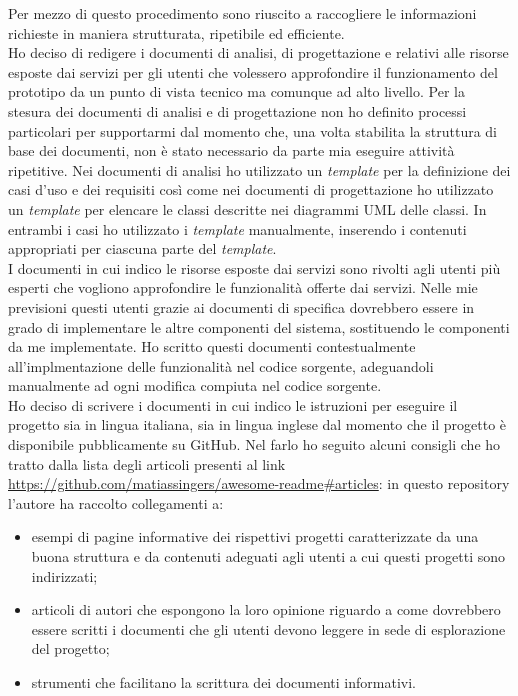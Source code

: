 Per mezzo di questo procedimento sono riuscito a raccogliere le informazioni richieste in maniera strutturata, ripetibile ed efficiente.\\
Ho deciso di redigere i documenti di analisi, di progettazione e relativi alle risorse esposte dai servizi per gli utenti che volessero approfondire il funzionamento del prototipo da un punto di vista tecnico ma comunque ad alto livello.
Per la stesura dei documenti di analisi e di progettazione non ho definito processi particolari per supportarmi dal momento che, una volta stabilita la struttura di base dei documenti, non è stato necessario da parte mia eseguire attività ripetitive. Nei documenti di analisi ho utilizzato un \emph{template} per la definizione dei casi d'uso e dei requisiti così come nei documenti di progettazione ho utilizzato un \emph{template} per elencare le classi descritte nei diagrammi UML delle classi. In entrambi i casi ho utilizzato i \emph{template} manualmente, inserendo i contenuti appropriati per ciascuna parte del \emph{template}.\\
I documenti in cui indico le risorse esposte dai servizi sono rivolti agli utenti più esperti che vogliono approfondire le funzionalità offerte dai servizi. Nelle mie previsioni questi utenti grazie ai documenti di specifica dovrebbero essere in grado di implementare le altre componenti del sistema, sostituendo le componenti da me implementate. Ho scritto questi documenti contestualmente all'implmentazione delle funzionalità nel codice sorgente, adeguandoli manualmente ad ogni modifica compiuta nel codice sorgente.\\
Ho deciso di scrivere i documenti in cui indico le istruzioni per eseguire il progetto sia in lingua italiana, sia in lingua inglese dal momento che il progetto è disponibile pubblicamente su GitHub. Nel farlo ho seguito alcuni consigli che ho tratto dalla lista degli articoli presenti al link \url{https://github.com/matiassingers/awesome-readme\#articles}: in questo \gls{repository} l'autore ha raccolto collegamenti a:
\begin{itemize}
  \item esempi di pagine informative dei rispettivi progetti caratterizzate da una buona struttura e da contenuti adeguati agli utenti a cui questi progetti sono indirizzati;
  \item articoli di autori che espongono la loro opinione riguardo a come dovrebbero essere scritti i documenti che gli utenti devono leggere in sede di esplorazione del progetto;
  \item strumenti che facilitano la scrittura dei documenti informativi.
\end{itemize}
